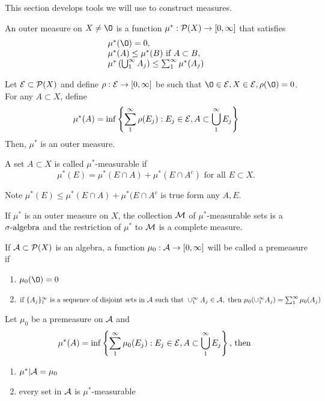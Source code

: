\begin{rmk}
This section develops tools we will use to construct measures.	
\end{rmk}

\begin{dfn} 
	An outer measure on $X\neq \O$ is a function $\mu^*: {\mathcal P}(X) \rightarrow [0, \infty]$ that satisfies\[
	\begin{array}{ll}
	\mu^*(\O)=0,\\
	\mu^*(A) \leq \mu^*(B) \text{ if } A \subset B, \\
	\mu^*\left( \bigcup_1^\infty A_j  \right) \leq \sum_1^\infty \mu^*(A_j)
	\end{array}\]
\end{dfn}
\begin{prop}
Let ${\mathcal E} \subset {\mathcal P}(X)$ and define $\rho: {\mathcal E} \rightarrow [0, \infty]$ be such that $\O \in \E, X \in \E, \rho(\O)=0$. For any $A \subset X$, define
\[
\mu^*(A)=  \inf  \left\{ \sum_1^\infty \rho(E_j): E_j \in {\mathcal E}, A \subset \bigcup_1^\infty E_j   \right\}
\]	
Then, $\mu^*$ is an outer measure.
\end{prop}
\begin{dfn}[$\mu^*$-measurable]
A set $A \subset X$ is called $\mu^*$-measurable if \[
	\mu^*(E)= \mu^*(E \cap A) + \mu^*(E \cap A^c) \text{ for all } E \subset X.
	\]
\end{dfn}
\begin{rmk}
Note $\mu^*(E) \leq \mu^*(E \cap A) + \mu^*(E \cap A^c$ is true form any $A, E$.	
\end{rmk}

\begin{thm}
If $\mu^*$ is an outer measure on $X$, the collection ${\mathcal M}$ of $\mu^*$-measurable sets is a ${\sigma}\text{-algebra}$ and the restriction of $\mu^*$ to ${\mathcal M}$ is a complete measure.
\end{thm}
\begin{dfn}[premeasure]
	If ${\mathcal A} \subset {\mathcal P}(X)$ is an algebra, a function $\mu_0: {\mathcal A} \rightarrow[0, \infty]$ will be called a premeasure if
	\begin{enumerate}
	\item $\mu_0(\O)=0$
	\item $\text{if } \{A_j\}_1^\infty \text{ is a sequence of disjoint sets in } {\mathcal A} \text{ such that } \cup_1^\infty A_j \in {\mathcal A}, \text{ then } \mu_0(\cup_1^\infty A_j)= \sum_1^\infty\mu_0(A_j)$	 
	\end{enumerate}
\end{dfn}

\begin{prop} Let $\mu_0$ be a premeasure on ${\mathcal A}$ and 
\[
\mu^*(A)=  \inf  \left\{ \sum_1^\infty \mu_0(E_j): E_j \in {\mathcal E}, A \subset \bigcup_1^\infty E_j   \right\} \text{, then }
\]		
\begin{enumerate}
\item $\mu^*| {\mathcal A} = \mu_0$
\item every set in ${\mathcal A}$ is $\mu^*$-measurable	
\end{enumerate}

\end{prop}






